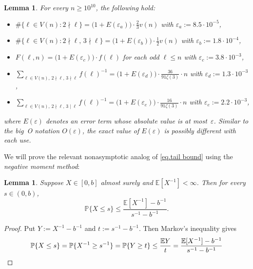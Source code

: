 \documentclass{article}
\theoremstyle{plain}
\newtheorem{lemma}[theorem]{Lemma}
\theoremstyle{definition}
\theoremstyle{remark}
\begin{document}
\begin{lemma}
\label{lem.estimates}
For every $n\geq 10^{10}$, the following hold:
\begin{itemize}
\item[(a)]
$\#\{\ell\in V(n):2\nmid\ell\}
=\big(1+E(\varepsilon_a)\big)\cdot\frac{2}{3}v(n)$ with $\varepsilon_a:=8.5\cdot10^{-5}$,
\item[(b)]
$\#\{\ell\in V(n):2\nmid\ell,\,3\nmid\ell\}
=\big(1+E(\varepsilon_b)\big)\cdot\frac{1}{2}v(n)$ with $\varepsilon_b:=1.8\cdot10^{-4}$,
\item[(c)]
$F(\ell,n)
=\big(1+E(\varepsilon_c)\big)\cdot f(\ell)$ for each odd $\ell\leq n$ with $\varepsilon_c:=3.8\cdot10^{-3}$,
\item[(d)]
$\sum_{\ell\in V(n),\,2\nmid\ell,\,3\nmid\ell}f(\ell)^{-1}
=\big(1+E(\varepsilon_d)\big)\cdot\frac{36}{91\zeta(3)}\cdot n$ with $\varepsilon_d:=1.3\cdot10^{-3}$,
\item[(e)]
$\sum_{\ell\in V(n),\,2\nmid\ell,\,3\mid\ell}f(\ell)^{-1}
=\big(1+E(\varepsilon_e)\big)\cdot\frac{16}{91\zeta(3)}\cdot n$ with $\varepsilon_e:=2.2\cdot10^{-3}$,
\end{itemize}
where $E(\varepsilon)$ denotes an error term whose absolute value is at most~$\varepsilon$.
Similar to the big~O notation $O(\varepsilon)$, the exact value of $E(\varepsilon)$ is possibly different with each use.
\end{lemma}

We will prove the relevant nonasymptotic analog of \eqref{eq.tail bound} using the \textit{negative moment method}:

\begin{lemma}
\label{lem.negative moment method}
Suppose $X\in[0,b]$ almost surely and $\mathbb{E}[X^{-1}] < \infty$.
Then for every $s\in(0,b)$,
\[
\mathbb{P}\{X\leq s\}
\leq\frac{\mathbb{E}[X^{-1}]-b^{-1}}{s^{-1}-b^{-1}}.
\]
\end{lemma}

\begin{proof}
Put $Y:=X^{-1}-b^{-1}$ and $t:=s^{-1}-b^{-1}$.
Then Markov's inequality gives
\[
\mathbb{P}\{X\leq s\}
=\mathbb{P}\{X^{-1}\geq s^{-1}\}
=\mathbb{P}\{Y\geq t\}
\leq\frac{\mathbb{E}Y}{t}
=\frac{\mathbb{E}[X^{-1}]-b^{-1}}{s^{-1}-b^{-1}}
\qedhere
\]
\end{proof}
\end{document}
